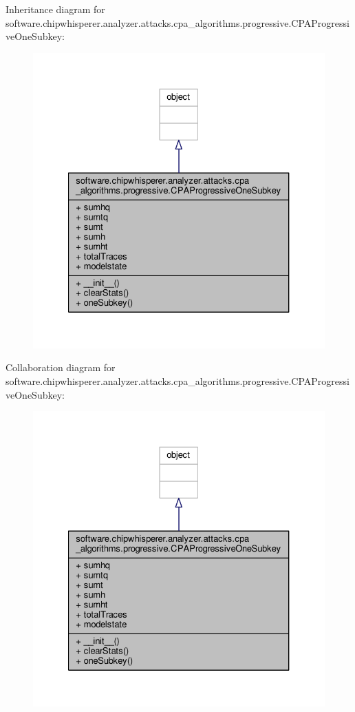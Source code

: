 Inheritance diagram for software.\+chipwhisperer.\+analyzer.\+attacks.\+cpa\+\_\+algorithms.\+progressive.\+C\+P\+A\+Progressive\+One\+Subkey\+:\nopagebreak
\begin{figure}[H]
\begin{center}
\leavevmode
\includegraphics[width=327pt]{d6/d47/classsoftware_1_1chipwhisperer_1_1analyzer_1_1attacks_1_1cpa__algorithms_1_1progressive_1_1CPAPr303e47a6313764d85e883d41789bc7d0}
\end{center}
\end{figure}


Collaboration diagram for software.\+chipwhisperer.\+analyzer.\+attacks.\+cpa\+\_\+algorithms.\+progressive.\+C\+P\+A\+Progressive\+One\+Subkey\+:\nopagebreak
\begin{figure}[H]
\begin{center}
\leavevmode
\includegraphics[width=327pt]{df/d20/classsoftware_1_1chipwhisperer_1_1analyzer_1_1attacks_1_1cpa__algorithms_1_1progressive_1_1CPAProgressiveOneSubkey__coll__graph}
\end{center}
\end{figure}


